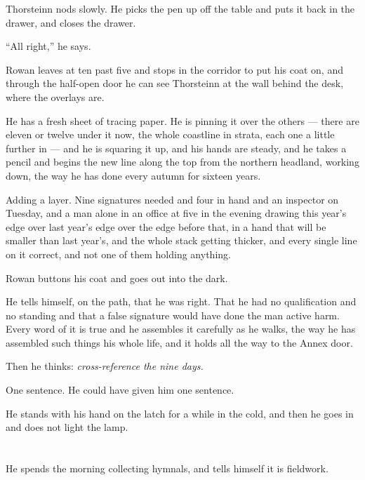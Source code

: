 \documentclass[11pt,oneside]{book}
\newcommand{\sceneline}{%
  \par\vspace{1.2em}
  \begin{center}
    \fontsize{11}{11}\selectfont \textbullet\quad\textbullet\quad\textbullet
  \end{center}
  \vspace{0.6em}\noindent\ignorespaces
}
\begin{document}
Thorsteinn nods slowly. He picks the pen up off the table and puts it
back in the drawer, and closes the drawer.

``All right,'' he says.

\sceneline

Rowan leaves at ten past five and stops in the corridor to put his coat
on, and through the half-open door he can see Thorsteinn at the wall
behind the desk, where the overlays are.

He has a fresh sheet of tracing paper. He is pinning it over the others
--- there are eleven or twelve under it now, the whole coastline in
strata, each one a little further in --- and he is squaring it up, and
his hands are steady, and he takes a pencil and begins the new line
along the top from the northern headland, working down, the way he has
done every autumn for sixteen years.

Adding a layer. Nine signatures needed and four in hand and an inspector
on Tuesday, and a man alone in an office at five in the evening drawing
this year's edge over last year's edge over the edge before that, in a
hand that will be smaller than last year's, and the whole stack getting
thicker, and every single line on it correct, and not one of them
holding anything.

Rowan buttons his coat and goes out into the dark.

He tells himself, on the path, that he was right. That he had no
qualification and no standing and that a false signature would have done
the man active harm. Every word of it is true and he assembles it
carefully as he walks, the way he has assembled such things his whole
life, and it holds all the way to the Annex door.

Then he thinks: \emph{cross-reference the nine days.}

One sentence. He could have given him one sentence.

He stands with his hand on the latch for a while in the cold, and then
he goes in and does not light the lamp.

\chapter{}

He spends the morning collecting hymnals, and tells himself it is
fieldwork.
\end{document}
